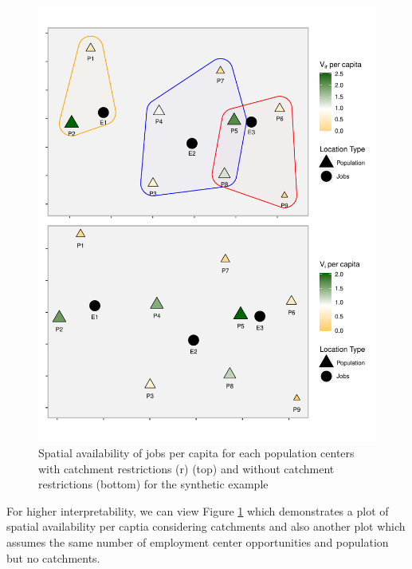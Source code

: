 \documentclass[]{elsarticle} %
\begin{document}
\begin{figure}
\includegraphics[width=1\linewidth]{Spatial-Availability_files/figure-latex/toy-example-availability-jobs-per-capita-1} \caption{\label{fig:toy-example-availability-jobs-per-capita} Spatial availability of jobs per capita for each population centers with catchment restrictions (r) (top) and without catchment restrictions (bottom) for the synthetic example}\label{fig:toy-example-availability-jobs-per-capita}
\end{figure}

For higher interpretability, we can view Figure
\ref{fig:toy-example-availability-jobs-per-capita} which demonstrates a
plot of spatial availability per captia considering catchments and also
another plot which assumes the same number of employment center
opportunities and population but no catchments.
\end{document}
